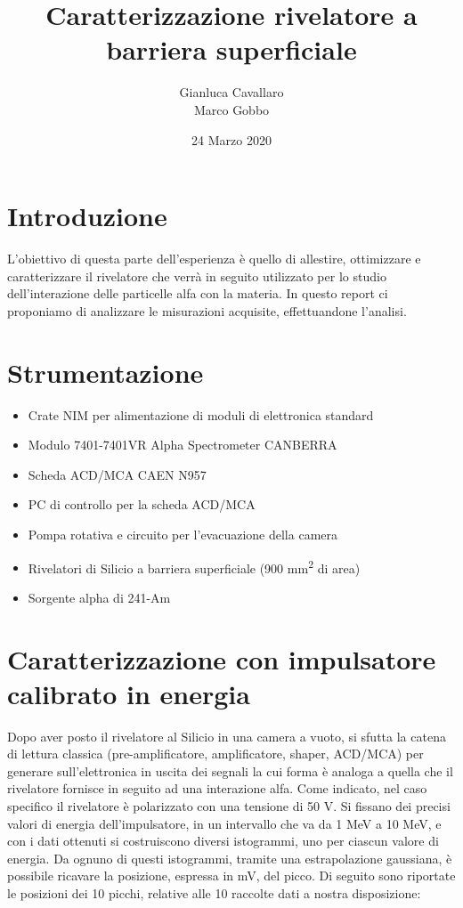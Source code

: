 \documentclass[a4paper,10pt]{article}
\title{Caratterizzazione rivelatore a barriera superficiale}
\author{Gianluca Cavallaro \\ Marco Gobbo}
\date{24 Marzo 2020}
\begin{document}
\maketitle
\section{Introduzione}
L'obiettivo di questa parte dell'esperienza \`e quello di allestire, ottimizzare e caratterizzare il rivelatore che verr\`a in seguito utilizzato per lo studio dell'interazione delle particelle alfa con la materia. In questo report ci proponiamo di analizzare le misurazioni acquisite, effettuandone l'analisi.
\section{Strumentazione}
\begin{itemize}
\item Crate NIM per alimentazione di moduli di elettronica standard
\item Modulo 7401-7401VR Alpha Spectrometer CANBERRA
\item Scheda ACD/MCA CAEN N957
\item PC di controllo per la scheda ACD/MCA
\item Pompa rotativa e circuito per l'evacuazione della camera
\item Rivelatori di Silicio a barriera superficiale (900 mm\textsuperscript{2} di area)
\item Sorgente alpha di 241-Am
\end{itemize}
\section{Caratterizzazione con impulsatore calibrato in energia}
Dopo aver posto il rivelatore al Silicio in una camera a vuoto, si sfutta la catena di lettura classica (pre-amplificatore, amplificatore, shaper, ACD/MCA) per generare sull'elettronica in uscita dei segnali la cui forma \`e analoga a quella che il rivelatore fornisce in seguito ad una interazione alfa. Come indicato, nel caso specifico il rivelatore \`e polarizzato con una tensione di 50 V. Si fissano dei precisi valori di energia dell'impulsatore, in un intervallo che va da 1 MeV a 10 MeV, e con i dati ottenuti si costruiscono diversi istogrammi, uno per ciascun valore di energia. Da ognuno di questi istogrammi, tramite una estrapolazione gaussiana, \`e possibile ricavare la posizione, espressa in mV, del picco. Di seguito sono riportate le posizioni dei 10 picchi, relative alle 10 raccolte dati a nostra disposizione:\\
\end{document}
